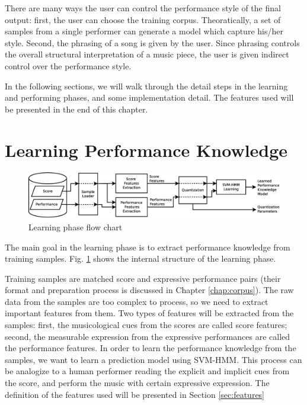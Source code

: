 There are many ways the user can control the performance style of the final output: first, the user can choose the training corpus. Theoratically, a set of samples from a single performer can generate a model which capture his/her style. Second, the phrasing of a song is given by the user. Since phrasing controls the overall structural interpretation of a music piece, the user is given indirect control over the performance style.


In the following sections, we will walk through the detail steps in the learning and performing phases, and some implementation detail. The features used will be presented in the end of this chapter.



\section{Learning Performance Knowledge}
\label{sec:learn}
\begin{figure}[tp]
   \begin{center}
      \includegraphics[width=\textwidth]{fig/learn_arch}
   \end{center}
   \caption{Learning phase flow chart} 
   \label{fig:learnflow}
\end{figure}
The main goal in the learning phase is to extract performance knowledge from training samples. Fig. \ref{fig:learnflow} shows the internal structure of the learning phase.

Training samples are matched score and expressive performance pairs (their format and preparation process is discussed in Chapter \ref{chap:corpus}). The raw data from the samples are too complex to process, so we need to extract important features from them. Two types of features will be extracted from the samples: first, the musicological cues from the scores are called score features; second, the measurable expression from the expressive performances are called the performance features. In order to learn the performance knowledge from the samples, we want to learn a prediction model using SVM-HMM. This process can be analogize to a human performer reading the explicit and implicit cues from the score, and perform the music with certain expressive expression. The definition of the features used will be presented in Section \ref{sec:features}


